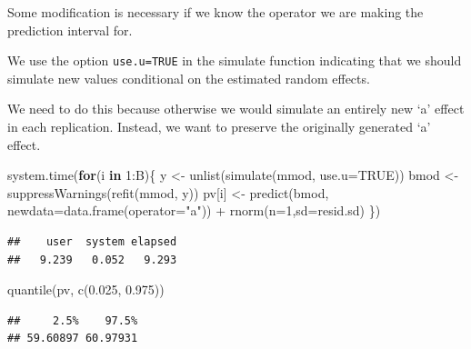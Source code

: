 \documentclass[
  ignorenonframetext,
]{beamer}
\newenvironment{Shaded}{\begin{snugshade}}{\end{snugshade}}
\newcommand{\AttributeTok}[1]{\textcolor[rgb]{0.77,0.63,0.00}{#1}}
\newcommand{\ConstantTok}[1]{\textcolor[rgb]{0.00,0.00,0.00}{#1}}
\newcommand{\ControlFlowTok}[1]{\textcolor[rgb]{0.13,0.29,0.53}{\textbf{#1}}}
\newcommand{\DecValTok}[1]{\textcolor[rgb]{0.00,0.00,0.81}{#1}}
\newcommand{\FloatTok}[1]{\textcolor[rgb]{0.00,0.00,0.81}{#1}}
\newcommand{\FunctionTok}[1]{\textcolor[rgb]{0.00,0.00,0.00}{#1}}
\newcommand{\NormalTok}[1]{#1}
\newcommand{\OtherTok}[1]{\textcolor[rgb]{0.56,0.35,0.01}{#1}}
\newcommand{\SpecialCharTok}[1]{\textcolor[rgb]{0.00,0.00,0.00}{#1}}
\newcommand{\StringTok}[1]{\textcolor[rgb]{0.31,0.60,0.02}{#1}}
\begin{document}
\begin{frame}[fragile]{}
\protect\hypertarget{section-13}{}
Some modification is necessary if we know the operator we are making the
prediction interval for.

We use the option \texttt{use.u=TRUE} in the simulate function
indicating that we should simulate new values conditional on the
estimated random effects.

We need to do this because otherwise we would simulate an entirely new
`a' effect in each replication. Instead, we want to preserve the
originally generated `a' effect.

\vspace{12pt}
\tiny

\begin{Shaded}
\begin{Highlighting}[]
\FunctionTok{system.time}\NormalTok{(}\ControlFlowTok{for}\NormalTok{(i }\ControlFlowTok{in} \DecValTok{1}\SpecialCharTok{:}\NormalTok{B)\{}
\NormalTok{ y }\OtherTok{\textless{}{-}} \FunctionTok{unlist}\NormalTok{(}\FunctionTok{simulate}\NormalTok{(mmod, }\AttributeTok{use.u=}\ConstantTok{TRUE}\NormalTok{))}
\NormalTok{  bmod }\OtherTok{\textless{}{-}} \FunctionTok{suppressWarnings}\NormalTok{(}\FunctionTok{refit}\NormalTok{(mmod, y))}
\NormalTok{  pv[i] }\OtherTok{\textless{}{-}} \FunctionTok{predict}\NormalTok{(bmod, }\AttributeTok{newdata=}\FunctionTok{data.frame}\NormalTok{(}\AttributeTok{operator=}\StringTok{"a"}\NormalTok{)) }\SpecialCharTok{+} 
    \FunctionTok{rnorm}\NormalTok{(}\AttributeTok{n=}\DecValTok{1}\NormalTok{,}\AttributeTok{sd=}\NormalTok{resid.sd)}
\NormalTok{\})}
\end{Highlighting}
\end{Shaded}

\begin{verbatim}
##    user  system elapsed 
##   9.239   0.052   9.293
\end{verbatim}

\begin{Shaded}
\begin{Highlighting}[]
\FunctionTok{quantile}\NormalTok{(pv, }\FunctionTok{c}\NormalTok{(}\FloatTok{0.025}\NormalTok{, }\FloatTok{0.975}\NormalTok{))}
\end{Highlighting}
\end{Shaded}

\begin{verbatim}
##     2.5%    97.5% 
## 59.60897 60.97931
\end{verbatim}
\end{frame}
\end{document}
